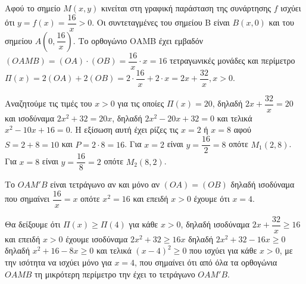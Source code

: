 
\begin{alist}
\item Αφού το σημείο $M(x,y)$ κινείται στη γραφική παράσταση της συνάρτησης $f$ ισχύει ότι
$y = f(x) = \dfrac{16}{x} > 0$. Οι συντεταγμένες του σημείου Β είναι $B(x, 0)$ και του σημείου $A\left(0, \dfrac{16}{x}\right)$.
Το ορθογώνιο ΟΑΜΒ έχει εμβαδόν $(OAMB) = (OA) \cdot (OB) = \dfrac{16}{x} \cdot x = 16$ τετραγωνικές μονάδες και περίμετρο $\Pi(x) = 2(OA) + 2(OB) = 2 \cdot \dfrac{16}{x} + 2 \cdot x = 2x + \dfrac{32}{x}, x > 0$.

\item Αναζητούμε τις τιμές του $x > 0$ για τις οποίες $\Pi(x) = 20$, δηλαδή $2x + \dfrac{32}{x} = 20$ και ισοδύναμα $2x^2 + 32 = 20x$, δηλαδή $2x^2 - 20x + 32 = 0$ και τελικά $x^2 - 10x + 16 = 0$.
Η εξίσωση αυτή έχει ρίζες τις $x = 2$ ή $x = 8$ αφού $S = 2 + 8 = 10$ και $P = 2 \cdot 8 = 16$.
Για $x = 2$ είναι $y = \dfrac{16}{2} = 8$ οπότε $M_1(2, 8)$.
Για $x = 8$ είναι $y = \dfrac{16}{8} = 2$ οπότε $M_2(8, 2)$.

\item 
\begin{rlist}
\item Το $OAM'B$ είναι τετράγωνο αν και μόνο αν $(OA) = (OB)$ δηλαδή ισοδύναμα που σημαίνει $\dfrac{16}{x} = x$
οπότε $x^2 = 16$ και επειδή $x > 0$ έχουμε ότι $x = 4$.
\item Θα δείξουμε ότι $\Pi(x) \ge \Pi(4)$ για κάθε $x > 0$, δηλαδή ισοδύναμα
$2x + \dfrac{32}{x} \ge 16$ και επειδή $x > 0$ έχουμε ισοδύναμα $2x^2 + 32 \ge 16x$ δηλαδή $2x^2 + 32 - 16x \ge 0$
δηλαδή $x^2 + 16 - 8x \ge 0$ και τελικά $(x - 4)^2 \ge 0$ που ισχύει για κάθε $x > 0$, με την ισότητα να
ισχύει μόνο για $x = 4$, που σημαίνει ότι από όλα τα ορθογώνια $OAMB$ τη μικρότερη
περίμετρο την έχει το τετράγωνο $OAM'B$.
\end{rlist}
\end{alist}

